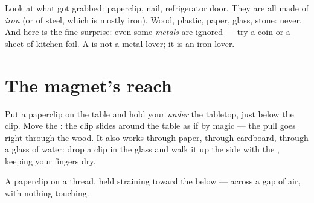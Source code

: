\begin{example}\label{ex:g1:magnets:iron}
Look at what got grabbed: paperclip, nail, refrigerator door. They
are all made of \emph{iron} (or of steel, which is mostly iron).
Wood, plastic, paper, glass, stone: never. And here is the fine
surprise: even some \emph{metals} are ignored --- try a coin or a
sheet of kitchen foil. A  is not a metal-lover; it is an
iron-lover.
\end{example}

\section{The magnet's reach}

\begin{example}\label{ex:g1:magnets:through}
Put a paperclip on the table and hold your  \emph{under} the
tabletop, just below the clip. Move the : the clip slides
around the table as if by magic --- the pull goes right through the
wood. It also works through paper, through cardboard, through a
glass of water: drop a clip in the glass and walk it up the side
with the , keeping your fingers dry.
\end{example}

\begin{omfigure}

{\small A paperclip on a thread, held straining toward the 
below --- across a gap of air, with nothing touching.}
\end{omfigure}


